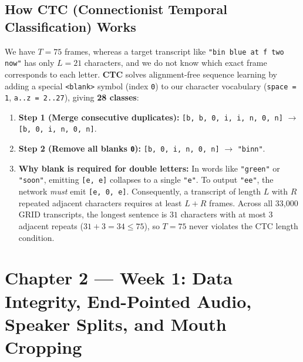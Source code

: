 \documentclass[11pt,a4paper]{article}
\newcommand{\code}[1]{\texttt{\small #1}}
\begin{document}
\subsection{How CTC (Connectionist Temporal Classification) Works}
We have $T = 75$ frames, whereas a target transcript like \code{"bin blue at f two now"} has only $L = 21$ characters, and we do not know which exact frame corresponds to each letter. \textbf{CTC} solves alignment-free sequence learning by adding a special \code{<blank>} symbol (index \code{0}) to our character vocabulary (\code{space = 1}, \code{a..z = 2..27}), giving \textbf{28 classes}:
\begin{enumerate}
  \item \textbf{Step 1 (Merge consecutive duplicates):} \code{[b, b, 0, i, i, n, 0, n]} $\to$ \code{[b, 0, i, n, 0, n]}.
  \item \textbf{Step 2 (Remove all blanks \code{0}):} \code{[b, 0, i, n, 0, n]} $\to$ \code{"binn"}.
  \item \textbf{Why blank is required for double letters:} In words like \code{"green"} or \code{"soon"}, emitting \code{[e, e]} collapses to a single \code{"e"}. To output \code{"ee"}, the network \emph{must} emit \code{[e, 0, e]}. Consequently, a transcript of length $L$ with $R$ repeated adjacent characters requires at least $L + R$ frames. Across all 33,000 GRID transcripts, the longest sentence is $31$ characters with at most $3$ adjacent repeats ($31 + 3 = 34 \le 75$), so $T=75$ never violates the CTC length condition.
\end{enumerate}

\section{Chapter 2 --- Week 1: Data Integrity, End-Pointed Audio, Speaker Splits, and Mouth Cropping}
\end{document}
